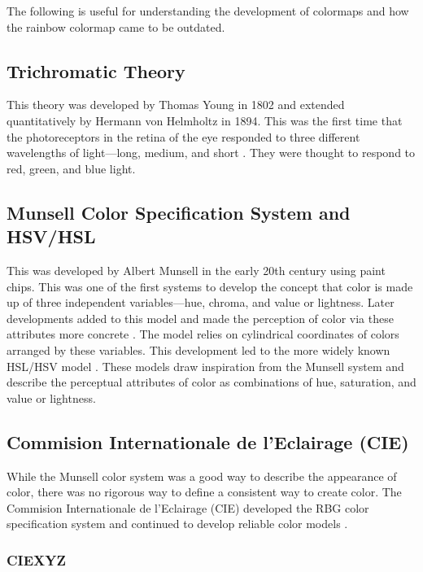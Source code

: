 \documentclass[journal]{IEEEtran}
\begin{document}
The following is useful for understanding the development of 
colormaps and how the rainbow colormap came to be outdated.

\subsection{Trichromatic Theory}

This theory was developed by Thomas Young in 1802 and extended quantitatively by 
Hermann von Helmholtz in 1894. This was the first time that the photoreceptors
in the retina of the eye responded to three different wavelengths of light---long,
medium, and short \cite{colorimetry}. They were thought to respond to red, green, and blue light.

\subsection{Munsell Color Specification System and HSV/HSL}

This was developed by Albert Munsell in the early 20th century using paint chips.
This was one of the first systems to develop the concept that color is
made up of three independent variables---hue, chroma, and value or lightness.
Later developments added to this model and made the perception of color via
these attributes more concrete \cite{colormapping}. The model relies on cylindrical coordinates
of colors arranged by these variables. This development led to the more
widely known HSL/HSV model \cite{colorimetry}. These models draw inspiration from the Munsell system
and describe the perceptual attributes of color as combinations of hue,
saturation, and value or lightness.

\subsection{Commision Internationale de l'Eclairage (CIE)}

While the Munsell color system was a good way to describe the appearance of color,
there was no rigorous way to define a consistent way to create color. The Commision
Internationale de l'Eclairage (CIE) developed the RBG color specification system
and continued to develop reliable color models \cite{colorimetry}.

\subsubsection{CIEXYZ}
\end{document}
